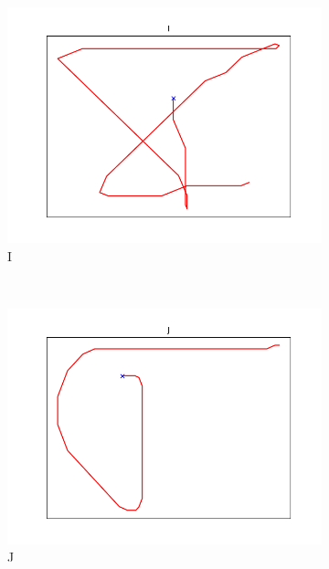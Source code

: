 \begin{figure}
\begin{subfigure}[b]{0.14\textwidth}
        \includegraphics[width=\textwidth]{images/gbem/letters_generated/I.png}
        \caption{I}
    \end{subfigure}
    ~
    \begin{subfigure}[b]{0.14\textwidth}
        \includegraphics[width=\textwidth]{images/gbem/letters_generated/J.png}
        \caption{J}
    \end{subfigure}
    ~
    \begin{subfigure}[b]{0.14\textwidth}

\end{subfigure}
\end{figure}
